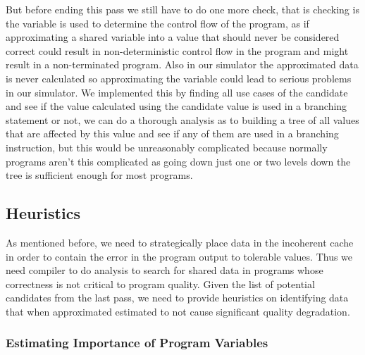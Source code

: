 \documentclass[12pt,conference]{IEEEtran}
\begin{document}
But before ending this pass we still have to do one more check, that is 
checking is the variable is used to determine the control flow of the
program, as if approximating a shared variable into a value that should
never be considered correct could result in non-deterministic control 
flow in the program and might result in a non-terminated program. Also
in our simulator the approximated data is never calculated so 
approximating the variable could lead to serious problems in our
simulator. We implemented this by finding all use cases of the candidate
and see if the value calculated using the candidate value is used in 
a branching statement or not, we can do a thorough analysis as to building
a tree of all values that are affected by this value and see if any of
them are used in a branching instruction, but this would be unreasonably
complicated because normally programs aren't this complicated as going down
just one or two levels down the tree is sufficient enough for most programs.

\subsection{Heuristics}

As mentioned before, we need to strategically place data
in the incoherent cache in order to contain the error in the 
program output to tolerable values. Thus we need compiler to do analysis 
to search for shared data in programs whose correctness is not critical to 
program quality. Given the list of potential candidates from the last
pass, we need to provide heuristics on identifying data that when
approximated estimated to not cause significant quality degradation.

\subsubsection{Estimating Importance of Program Variables}
\end{document}
